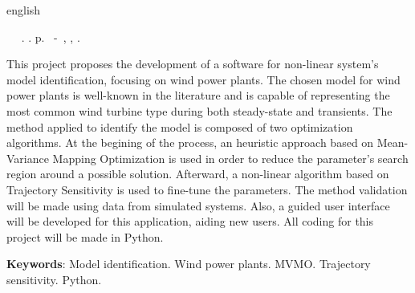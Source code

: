 \begin{resumo}[Abstract]
 \begin{otherlanguage*}{english}
	\begin{flushleft} 
		\setlength{\absparsep}{0pt} %
 		\SingleSpacing 
 		\imprimirautorabr~ ~\textbf{\imprimirtitleabstract}.	\imprimirdata.  \pageref{LastPage}p. 
		\imprimirtipotrabalho~-~\imprimirinstituicao, \imprimirlocal, 	\imprimirdata. 
 	\end{flushleft}
\OnehalfSpacing
This project proposes the development of a software for non-linear system's model identification, focusing on wind power plants. The chosen model  for wind power plants is well-known in the literature and is capable of representing the most common wind turbine type during both steady-state and transients. The method applied to identify the model is composed of two optimization algorithms. At the begining of the process, an heuristic approach based on Mean-Variance Mapping Optimization is used in order to reduce the parameter's search region around a possible solution. Afterward, a non-linear algorithm based on Trajectory Sensitivity is used to fine-tune the parameters. The method validation will be made using data from simulated systems. Also, a guided user interface will be developed for this application, aiding new users. All coding for this project will be made in Python.


\textbf{Keywords}: Model identification. Wind power plants. MVMO. Trajectory sensitivity. Python.
 \end{otherlanguage*}
\end{resumo}
